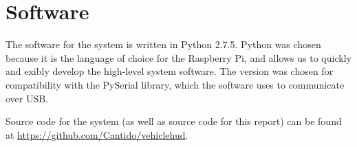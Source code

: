 \section{Software}
The software for the system is written in Python 2.7.5. Python was chosen
because it is the language of choice for the Raspberry Pi, and allows us to
quickly and 
exibly develop the high-level system software. The version was
chosen for compatibility with the PySerial library, which the software uses to
communicate over USB.

Source code for the system (as well as source code for this report) can be
found at \url{https://github.com/Cantido/vehiclehud}.
